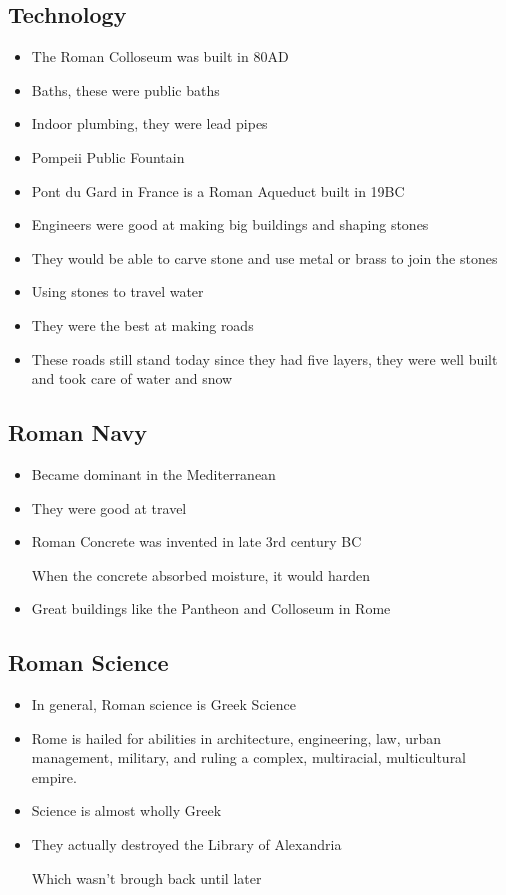 \documentclass{article}
\begin{document}
\subsection{Technology}
\begin{itemize}
  \item The Roman Colloseum was built in 80AD
  \item Baths, these were public baths
  \item Indoor plumbing, they were lead pipes
  \item Pompeii Public Fountain
  \item Pont du Gard in France is a Roman Aqueduct built in 19BC
  \item Engineers were good at making big buildings and shaping stones
  \item They would be able to carve stone and use metal or brass to join the stones
  \item Using stones to travel water
  \item They were the best at making roads
  \item These roads still stand today since they had five layers,
    they were well built and took care of water and snow
\end{itemize}

\subsection{Roman Navy}
\begin{itemize}
  \item Became dominant in the Mediterranean
  \item They were good at travel
  \item Roman Concrete was invented in late 3rd century BC

    When the concrete absorbed moisture, it would harden
  \item Great buildings like the Pantheon and Colloseum in Rome
\end{itemize}

\subsection{Roman Science}
\begin{itemize}
  \item In general, Roman science is Greek Science
  \item Rome is hailed for abilities in architecture, engineering, law, urban management,  military,
    and ruling a complex, multiracial, multicultural empire.
  \item Science is almost wholly Greek
  \item They actually destroyed the Library of Alexandria

    Which wasn't brough back until later
\end{itemize}
\end{document}
